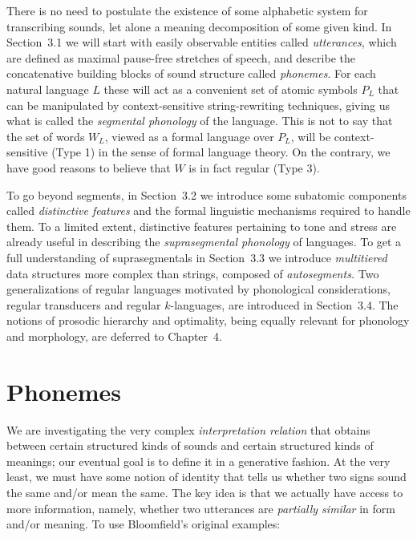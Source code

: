 There is no need to postulate the existence of some alphabetic system for
transcribing sounds, let alone a meaning decomposition of some given kind. In
Section~3.1 we will start with easily observable entities called {\it
  utterances}, which are defined as maximal pause-free
stretches of speech, and describe the concatenative building blocks of sound
structure called {\it phonemes}. For each natural language $L$ these will act
as a convenient set of atomic symbols $P_L$ that can be manipulated by
context-sensitive string-rewriting techniques, giving us what is called the
{\it segmental phonology} of the language.  This is not to say that the set of
words $W_L$, viewed as a formal language over $P_L$, will be context-sensitive
(Type 1) in the sense of formal language theory. On the contrary, we have good
reasons to believe that $W$ is in fact regular (Type 3).

To go beyond segments, in Section~3.2 we introduce some subatomic components
called {\it distinctive features} and the formal linguistic mechanisms
required to handle them. To a limited extent, distinctive features pertaining
to tone and stress are already useful in describing the {\it suprasegmental
  phonology} of languages. To get a full understanding of suprasegmentals in
Section~3.3 we introduce {\it multitiered} data structures more complex than
strings, composed of {\it autosegments.} Two generalizations of regular
languages motivated by phonological considerations, regular transducers and
regular $k$-languages, are introduced in Section~3.4. The notions of prosodic
hierarchy and optimality, being equally relevant for phonology and morphology,
are deferred to Chapter~4.

\section{Phonemes}

We are investigating the very complex {\it interpretation relation}
 that obtains between certain structured
kinds of sounds and certain structured kinds of meanings; our eventual goal is
to define it in a generative fashion. At the very least, we must have some
notion of identity that tells us whether two signs sound the same and/or mean
the same. The key idea is that we actually have access to more information,
namely, whether two utterances are {\it partially similar} in form and/or
meaning.  To use Bloomfield's original examples:

